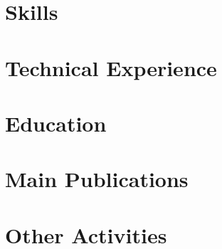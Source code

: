 \documentclass[letter,10pt]{article}
\begin{document}


% 


\section{Skills}


\section{Technical Experience}


\section{Education}


\section{Main Publications}


\section{Other Activities}

\end{document}
